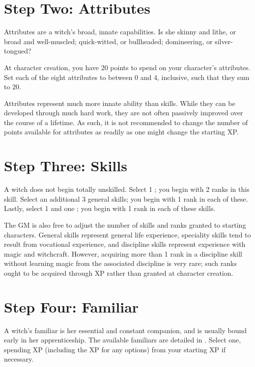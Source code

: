 \section{Step Two: Attributes}

Attributes are a witch's broad, innate capabilities.
Is she skinny and lithe, or broad and well-muscled; quick-witted, or bullheaded; domineering, or silver-tongued?

At character creation, you have 20 points to spend on your character's attributes.
Set each of the eight attributes to between 0 and 4, inclusive, such that they sum to 20.

Attributes represent much more innate ability than skills.
While they can be developed through much hard work, they are not often passively improved over the course of a lifetime.
As such, it is not recommended to change the number of points available for attributes as readily as one might change the starting XP.

\section{Step Three: Skills}

A witch does not begin totally unskilled.
Select 1 ; you begin with 2 ranks in this skill.
Select an additional 3 general skills; you begin with 1 rank in each of these.
Lastly, select 1  and one ; you begin with 1 rank in each of these skills.

The GM is also free to adjust the number of skills and ranks granted to starting characters.
General skills represent general life experience, speciality skills tend to result from vocational experience, and discipline skills represent experience with magic and witchcraft.
However, acquiring more than 1 rank in a discipline skill without learning magic from the associated discipline is very rare; such ranks ought to be acquired through XP rather than granted at character creation.

\section{Step Four: Familiar}

A witch's familiar is her essential and constant companion, and is usually bound early in her apprenticeship.
The available familiars are detailed in .
Select one, spending XP (including the XP for any options) from your starting XP if necessary.

